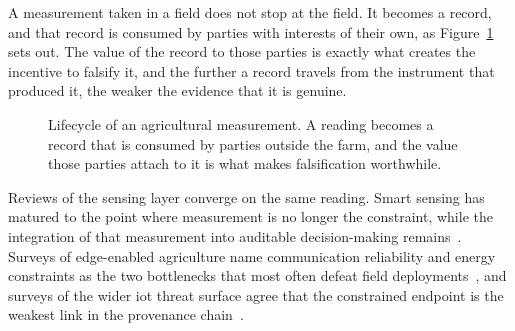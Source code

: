 \documentclass[12pt,a4paper,oneside]{book}
\begin{document}
A measurement taken in a field does not stop at the field. It becomes a record,
and that record is consumed by parties with interests of their own, as
Figure~\ref{fig:lifecycle} sets out. The value of the record to those parties
is exactly what creates the incentive to falsify it, and the further a record
travels from the instrument that produced it, the weaker the evidence that it
is genuine.

\begin{figure}[htbp]
  \centering
  \caption{Lifecycle of an agricultural measurement. A reading becomes a record
           that is consumed by parties outside the farm, and the value those
           parties attach to it is what makes falsification worthwhile.}
  \label{fig:lifecycle}
\end{figure}

Reviews of the sensing layer converge on the same reading. Smart sensing has
matured to the point where measurement is no longer the constraint, while the
integration of that measurement into auditable decision-making
remains~\cite{soussi2024smartsensors, gong2025edge}. Surveys of edge-enabled
agriculture name communication reliability and energy constraints as the two
bottlenecks that most often defeat field deployments~\cite{gong2025edge}, and
surveys of the wider \gls{iot} threat surface agree that the constrained
endpoint is the weakest link in the provenance chain~\cite{aouedi2024surveyintelligent,
sahu2024exploringsecurity}.
\end{document}
